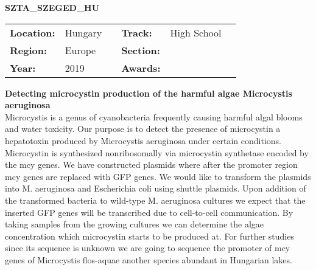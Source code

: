 \textbf{\uppercase{SZTA\_Szeged\_HU}} \FloatBarrier \begin{table}[h] \begin{tabular}{lp{2.5cm}llll} \textbf{Location:} & Hungary & \multicolumn{1}{|l}{} & \textbf{Track:}   & High School \\ \textbf{Region:}   & Europe   & \multicolumn{1}{|l}{} & \textbf{Section:} &  \\ \textbf{Year:}     & 2019   & \multicolumn{1}{|l}{} & \textbf{Awards:}  & \end{tabular} \end{table} \FloatBarrier \noindent\textbf{Detecting microcystin production of the harmful algae Microcystis aeruginosa} \vspace{.2cm}\\ 
Microcystis is a genus of cyanobacteria frequently causing harmful algal blooms and water toxicity. Our purpose is to detect the presence of microcystin a hepatotoxin produced by Microcystis aeruginosa under certain conditions. Microcystin is synthesized nonribosomally via microcystin synthetase encoded by the mcy genes. We have constructed plasmids where after the promoter region mcy genes are replaced with GFP genes. We would like to transform the plasmids into M. aeruginosa and Escherichia coli using shuttle plasmids. Upon addition of the transformed bacteria to wild-type M. aeruginosa cultures we expect that the inserted GFP genes will be transcribed due to cell-to-cell communication. By taking samples from the growing cultures we can determine the algae concentration which microcystin starts to be produced at. For further studies since its sequence is unknown we are going to sequence the promoter of mcy genes of Microcystis flos-aquae another species abundant in Hungarian lakes.
\vspace{2cm} $ $
\pagebreak

